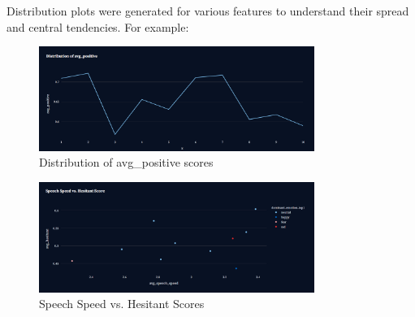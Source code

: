 \documentclass{article}
\begin{document}
Distribution plots were generated for various features to understand their spread and central tendencies. For example:

\begin{figure}[H]
    \centering
    \includegraphics[width=0.8\textwidth]{images/avg_positve_distribution.png}
    \caption{Distribution of avg\_positive scores}
    \label{fig:avg_positive_distribution}
\end{figure}


\begin{figure}[H]
    \centering
    \includegraphics[width=0.8\textwidth]{images/speech_speed_vs_hesitant.png}
    \caption{Speech Speed vs. Hesitant Scores}
    \label{fig:speech_speed_vs_hesitant}
\end{figure}
\end{document}
